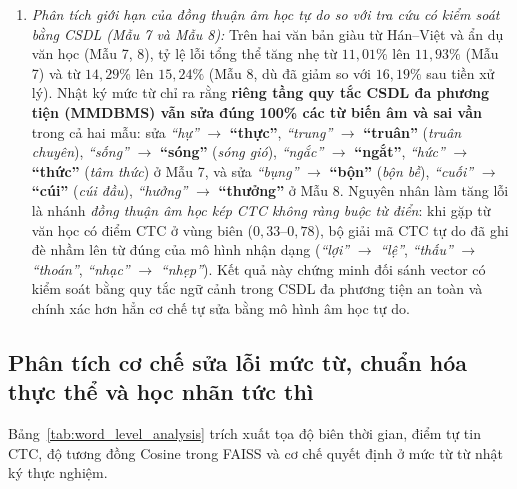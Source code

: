 \documentclass[12pt,a4paper]{article}
\begin{document}
\begin{enumerate}
  \item \textit{Phân tích giới hạn của đồng thuận âm học tự do so với tra cứu có kiểm soát bằng CSDL (Mẫu 7 và Mẫu 8):} Trên hai văn bản giàu từ Hán--Việt và ẩn dụ văn học (Mẫu 7, 8), tỷ lệ lỗi tổng thể tăng nhẹ từ $11{,}01\%$ lên $11{,}93\%$ (Mẫu 7) và từ $14{,}29\%$ lên $15{,}24\%$ (Mẫu 8, dù đã giảm so với $16{,}19\%$ sau tiền xử lý). Nhật ký mức từ chỉ ra rằng \textbf{riêng tầng quy tắc CSDL đa phương tiện (MMDBMS) vẫn sửa đúng 100\% các từ biến âm và sai vần} trong cả hai mẫu: sửa \textit{``hự''} $\to$ \textbf{``thực''}, \textit{``trung''} $\to$ \textbf{``truân''} (\textit{truân chuyên}), \textit{``sống''} $\to$ \textbf{``sóng''} (\textit{sóng gió}), \textit{``ngắc''} $\to$ \textbf{``ngắt''}, \textit{``hức''} $\to$ \textbf{``thức''} (\textit{tâm thức}) ở Mẫu 7, và sửa \textit{``bụng''} $\to$ \textbf{``bộn''} (\textit{bộn bề}), \textit{``cuối''} $\to$ \textbf{``cúi''} (\textit{cúi đầu}), \textit{``hưởng''} $\to$ \textbf{``thưởng''} ở Mẫu 8. Nguyên nhân làm tăng lỗi là nhánh \textit{đồng thuận âm học kép CTC không ràng buộc từ điển}: khi gặp từ văn học có điểm CTC ở vùng biên ($0{,}33\text{--}0{,}78$), bộ giải mã CTC tự do đã ghi đè nhầm lên từ đúng của mô hình nhận dạng (\textit{``lợi''} $\to$ \textit{``lệ''}, \textit{``thấu''} $\to$ \textit{``thoán''}, \textit{``nhạc''} $\to$ \textit{``nhẹp''}). Kết quả này chứng minh đối sánh vector có kiểm soát bằng quy tắc ngữ cảnh trong CSDL đa phương tiện an toàn và chính xác hơn hẳn cơ chế tự sửa bằng mô hình âm học tự do.
\end{enumerate}

\subsection{Phân tích cơ chế sửa lỗi mức từ, chuẩn hóa thực thể và học nhãn tức thì}
Bảng~\ref{tab:word_level_analysis} trích xuất tọa độ biên thời gian, điểm tự tin CTC, độ tương đồng Cosine trong FAISS và cơ chế quyết định ở mức từ từ nhật ký thực nghiệm.
\end{document}
